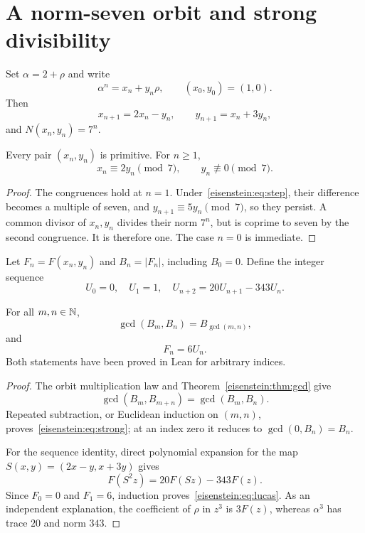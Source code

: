 \section{A norm-seven orbit and strong divisibility}
Set $\alpha=2+\rho$ and write
\begin{equation}\label{eisenstein:eq:orbit}
\alpha^n=x_n+y_n\rho,\qquad (x_0,y_0)=(1,0).
\end{equation}
Then
\begin{equation}\label{eisenstein:eq:step}
x_{n+1}=2x_n-y_n,\qquad y_{n+1}=x_n+3y_n,
\end{equation}
and $N(x_n,y_n)=7^n$.

\begin{lemma}\label{eisenstein:lem:primitive}
Every pair $(x_n,y_n)$ is primitive. For $n\ge1$,
\[
x_n\equiv2y_n\pmod7,\qquad y_n\not\equiv0\pmod7.
\]
\end{lemma}
\begin{proof}
The congruences hold at $n=1$. Under~\eqref{eisenstein:eq:step}, their difference becomes a multiple of seven, and $y_{n+1}\equiv5y_n\pmod7$, so they persist. A common divisor of $x_n,y_n$ divides their norm $7^n$, but is coprime to seven by the second congruence. It is therefore one. The case $n=0$ is immediate.
\end{proof}

\begin{definition}
Let $F_n=F(x_n,y_n)$ and $B_n=|F_n|$, including $B_0=0$. Define the integer sequence
\[
U_0=0,\quad U_1=1,\quad U_{n+2}=20U_{n+1}-343U_n.
\]
\end{definition}

\begin{theorem}\label{eisenstein:thm:strong}
For all $m,n\in\mathbb N$,
\begin{equation}\label{eisenstein:eq:strong}
\gcd(B_m,B_n)=B_{\gcd(m,n)},
\end{equation}
and
\begin{equation}\label{eisenstein:eq:lucas}
F_n=6U_n.
\end{equation}
Both statements have been proved in Lean for arbitrary indices.
\end{theorem}
\begin{proof}
The orbit multiplication law and Theorem~\ref{eisenstein:thm:gcd} give
\[
\gcd(B_m,B_{m+n})=\gcd(B_m,B_n).
\]
Repeated subtraction, or Euclidean induction on $(m,n)$, proves~\eqref{eisenstein:eq:strong}; at an index zero it reduces to $\gcd(0,B_n)=B_n$.

For the sequence identity, direct polynomial expansion for the map $S(x,y)=(2x-y,x+3y)$ gives
\[
F(S^2z)=20F(Sz)-343F(z).
\]
Since $F_0=0$ and $F_1=6$, induction proves~\eqref{eisenstein:eq:lucas}. As an independent explanation, the coefficient of $\rho$ in $z^3$ is $3F(z)$, whereas $\alpha^3$ has trace $20$ and norm $343$.
\end{proof}

